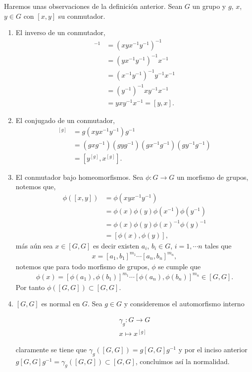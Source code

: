 \begin{ob}\label{ob:pr_de_los_conmutadores}
Haremos unas observaciones de la definición anterior. Sean $G$ un grupo y $g$, $x$, $y \in G$ con $[x,y]$ su conmutador.

\begin{enumerate}
	\item El inverso de un conmutador,
	\begin{align*}
	[x,y]^{-1} & =(xyx^{-1}y^{-1})^{-1} \\
	& = (yx^{-1}y^{-1})^{-1}x^{-1} \\
	& = (x^{-1}y^{-1})^{-1}y^{-1}x^{-1} \\
	& = (y^{-1})^{-1}xy^{-1}x^{-1} \\
	& = yxy^{-1}x^{-1} = [y,x] .
	\end{align*}
	\item El conjugado de un conmutador, 
	\begin{align*}
	[x,y]^{[g]} & = g(xyx^{-1}y^{-1})g^{-1} \\
	& = (gxg^{-1})(gyg^{-1})(gx^{-1}g^{-1})(gy^{-1}g^{-1}) \\
	& =  [y^{[g]},x^{[g]}].
	\end{align*}
	
	\item El conmutador bajo homeomorfismos. Sea $\phi:G \to G$ un morfismo de grupos, notemos que,
	\begin{align*}
	\phi([x,y]) & = \phi(xyx^{-1}y^{-1})\\
	& = \phi(x)\phi(y)\phi(x^{-1})\phi(y^{-1}) \\
	& = \phi(x)\phi(y)\phi(x)^{-1}\phi(y)^{-1} \\
	& =  [\phi(x),\phi(y)],     
	\end{align*}
	más aún sea $x \in [G,G]$ es decir existen $a_i$, $b_i \in G$, $i=1, \cdots n$ tales que
	\begin{align*}
	x=[a_1,b_1]^{m_1} \cdots[a_n,b_n]^{m_n},
	\end{align*}
	notemos que para todo morfismo de grupos, $\phi$ se cumple que
	\begin{align*}
	\phi(x)=[\phi(a_1),\phi(b_1)]^{m_1} \cdots[\phi(a_n),\phi(b_n)]^{m_n} \in [G,G].
	\end{align*}
	 Por tanto $\phi([G,G]) \subset [G,G]$.
	\item $[G,G]$ es normal en $G$. Sea $g \in G$ y consideremos el automorfismo interno 
	
	\begin{align*}
	\gamma_g:G \to G \\
	x \mapsto x^{[g]}
	\end{align*}	 
	
	claramente se tiene que $\gamma_g([G,G])=g[G,G]g^{-1}$ y por el inciso anterior $g[G,G]g^{-1}=\gamma_g([G,G]) \subset [G,G]$, concluimos así la normalidad.
\end{enumerate}
\end{ob}

